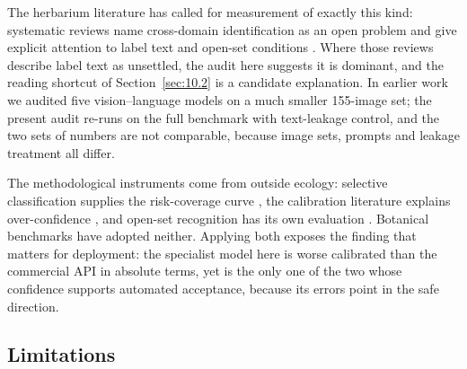 \documentclass[preprint,12pt,authoryear]{elsarticle}
\begin{document}
The herbarium literature has called for measurement of exactly this kind: systematic reviews name cross-domain identification as an open problem \citep{hussein2022} and give explicit attention to label text and open-set conditions \citep{guo2025}. Where those reviews describe label text as unsettled, the audit here suggests it is dominant, and the reading shortcut of Section~\ref{sec:10.2} is a candidate explanation. In earlier work we audited five vision--language models on a much smaller 155-image set; the present audit re-runs on the full benchmark with text-leakage control, and the two sets of numbers are not comparable, because image sets, prompts and leakage treatment all differ.

The methodological instruments come from outside ecology: selective classification supplies the risk-coverage curve \citep{geifman2017}, the calibration literature explains over-confidence \citep{guo2017}, and open-set recognition has its own evaluation \citep{geng2020,yang2024,wang2023}. Botanical benchmarks have adopted neither. Applying both exposes the finding that matters for deployment: the specialist model here is worse calibrated than the commercial API in absolute terms, yet is the only one of the two whose confidence supports automated acceptance, because its errors point in the safe direction.

\setcounter{section}{10}

\setcounter{subsection}{4}

\subsection{Limitations}\label{sec:10.5}
\end{document}
